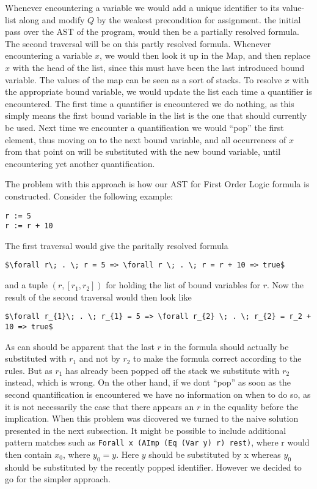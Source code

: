 Whenever encountering a variable we would add a unique identifier to its value-list along and modify $Q$ by the weakest precondition for assignment.
the initial pass over the AST of the program, would then be a partially resolved formula.
The second traversal will be on this partly resolved formula. Whenever encountering a variable $x$, we would then look it up in the Map, and then replace $x$ with the head of the list, since this must have been the last introduced bound variable. The values of the map can be seen as a sort of stacks. To resolve $x$ with the appropriate bound variable, we would update the list each time a quantifier is encountered.
The first time a quantifier is encountered we do nothing, as this simply means the first bound variable in the list is the one that should currently be used. 
Next time we encounter a quantification we would ``pop'' the first element, thus moving on to the next bound variable, and all occurrences of $x$ from that point on will be substituted with the new bound variable, until encountering yet another quantification.

The problem with this approach is how our AST for First Order Logic formula is constructed. Consider the following example:
\begin{lstlisting}
r := 5
r := r + 10
\end{lstlisting}
The first traversal would give the paritally resolved formula
\begin{lstlisting}[mathescape=true]
$\forall r\; . \; r = 5 => \forall r \; . \; r = r + 10 => true$
\end{lstlisting}
and a tuple $(r, [r_1, r_2])$ for holding the list of bound variables for $r$.
Now the result of the second traversal would then look like
\begin{lstlisting}[mathescape=true]
$\forall r_{1}\; . \; r_{1} = 5 => \forall r_{2} \; . \; r_{2} = r_2 + 10 => true$
\end{lstlisting}
As can should be apparent that the last $r$ in the formula should actually be substituted with $r_1$ and not by $r_{2}$ to make the formula correct according to the rules. But as $r_1$ has already been popped off the stack we substitute with $r_{2}$ instead, which is wrong.
On the other hand, if we dont ``pop'' as soon as the second quantification is encountered we have no information on when to do so, as it is not necessarily the case that there appears an $r$ in the equality before the implication. 
When this problem was dicovered we turned to the naive solution presented in the next subsection.
It might be possible to include additional pattern matches such as \texttt{Forall x (AImp (Eq (Var y) r) rest)}, where r would then contain $x_0$, where $y_0 = y$. Here $y$ should be substituted by x whereas $y_0$ should be substituted by the recently popped identifier. However we decided to go for the simpler approach.

